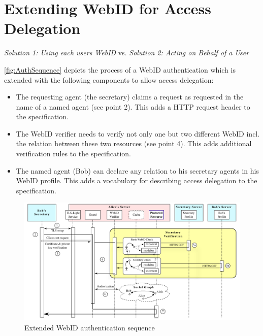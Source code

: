 \documentclass[a4paper]{llncs}
\begin{document}

\section{Extending WebID for Access Delegation}\label{sec:spec}

\textit{Solution 1: Using each users WebID} vs.
\textit{Solution 2: Acting on Behalf of a User}


\autoref{fig:AuthSequence} depicts the process of a WebID authentication which is extended with the following components to allow access delegation:

\begin{itemize}
    \item The requesting agent (the secretary) claims a request as requested in the name of a named agent (see point 2).
        This adds a HTTP request header to the specification.
    \item The WebID verifier needs to verify not only one but two different WebID incl. the relation between these two resources (see point 4).
        This adds additional verification rules to the specification.
    \item The named agent (Bob) can declare any relation to his secretary agents in his WebID profile.
        This adds a vocabulary for describing access delegation to the specification.
\end{itemize}

\begin{figure}[htb]
  \centering
  \includegraphics[width=\textwidth]{AuthSequence}
  \caption{Extended WebID authentication sequence}
  \label{fig:AuthSequence}
\end{figure}
\end{document}
